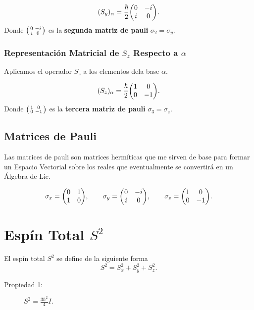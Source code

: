 \begin{equation}
	(S_y)_\alpha = \frac{\hbar}{2} \mqty(0 & -i \\ i & 0).
\end{equation}
Donde $\smqty(\pmat{2})$ es la \textbf{segunda matriz de pauli} $\sigma _2 = \sigma _y$.









\subsubsection{Representación Matricial de $S_z$ Respecto a $\alpha$}

Aplicamos el operador $S_z$ a los elementos dela base $\alpha$.

\begin{equation}
	(S_z)_\alpha = \frac{\hbar}{2} \mqty(1 & 0 \\ 0 & -1).
\end{equation}
Donde $\smqty(\pmat{3})$ es la \textbf{tercera matriz de pauli} $\sigma _3 = \sigma _z$.


\subsection{Matrices de Pauli}
Las matrices de pauli son matrices hermíticas que me sirven de base para formar un Espacio Vectorial sobre los reales que eventualmente se convertirá en un Álgebra de Lie.

\begin{equation}
	\pauli{x} = \mqty(\pmat{1}), \qquad \pauli{y} = \mqty(\pmat{2}), \qquad \pauli{z} = \mqty(\pmat{3}).
\end{equation}



\section{Espín Total $S^2$}
El espín total $S^2$ se define de la siguiente forma
\begin{equation}
	S^2 = S_x ^2 + S_y ^2 + S_z ^2.
\end{equation}


\begin{description}
	\item[Propiedad 1: ] $S^2 = \frac{3\hbar ^2}{4} I$.
\end{description}


